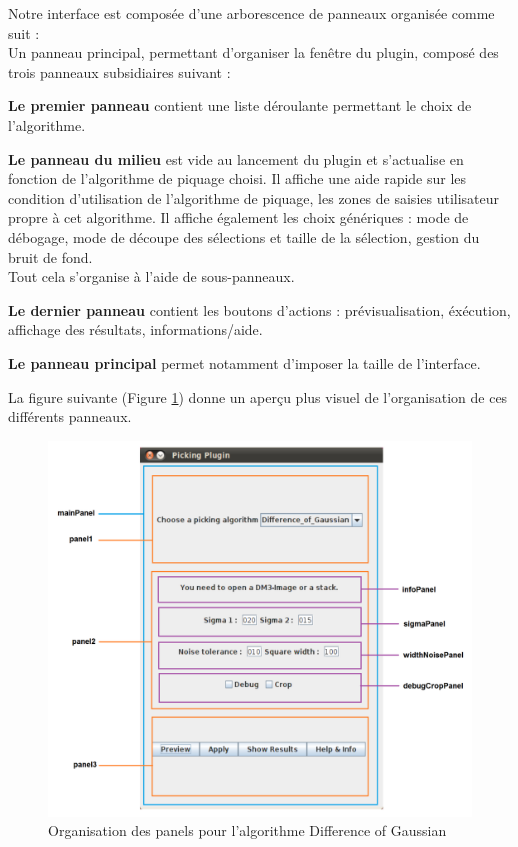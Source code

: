 Notre interface est composée d'une arborescence de panneaux organisée comme suit : \\
Un panneau principal, permettant d'organiser la fenêtre du plugin, composé des trois panneaux subsidiaires suivant :
\begin{description}
\item \textbf{Le premier panneau} contient une liste déroulante permettant le choix de l'algorithme. 
\item \textbf{Le panneau du milieu} est vide au lancement du plugin et s'actualise en fonction de l'algorithme de piquage choisi. Il affiche une aide rapide sur les condition d'utilisation de l'algorithme de piquage, les zones de saisies utilisateur propre à cet algorithme. Il affiche également les choix génériques : mode de débogage, mode de découpe des sélections et taille de la sélection, gestion du bruit de fond. \\
Tout cela s'organise à l'aide de sous-panneaux.
\item \textbf{Le dernier panneau} contient les boutons d'actions : prévisualisation, éxécution, affichage des résultats, informations/aide.
\item \textbf{Le panneau principal} permet notamment d'imposer la taille de l'interface.
\end{description}

La figure suivante (Figure \ref{panneaux}) donne un aperçu plus visuel de l'organisation de ces différents panneaux.
\begin{figure}[!h] 
\includegraphics[width=1\textwidth]{plugin3-1.png}
\caption{Organisation des panels pour l'algorithme Difference of Gaussian}
\label{panneaux}
\end{figure}
\pagebreak

